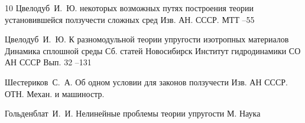 \begin{thebibliography}{10}
\by Цвелодуб~И.~Ю.
 некоторых возможных путях построения теории установившейся ползучести сложных сред
\jour Изв. АН. СССР. МТТ
--55
    
\by Цвелодуб~И.~Ю.
\paper К разномодульной теории упругости изотропных материалов
\inbook Динамика сплошной среды
\bookinfo Сб. статей
\publaddr Новосибирск
\publ Институт гидродинамики СО АН СССР
\volinfo Вып. 32
--131
  	
\by Шестериков~С.~А.
\paper Об одном условии для законов ползучести
\jour Изв. АН СССР. ОТН. Механ. и машиностр.
       
\by Гольденблат~И.~И.
\book Нелинейные проблемы теории упругости
\yr М.
\publ Наука
  
   \end{thebibliography}
   
\RuDate

\bigskip

\makeentitle


\EngRef


